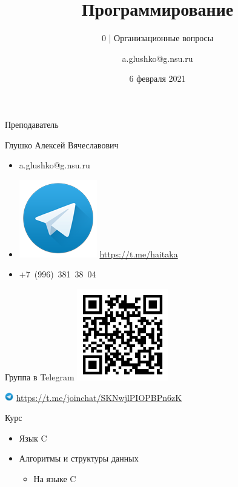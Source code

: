 \documentclass[aspectratio=169,14pt]{beamer}
\title{Программирование}
\subtitle{0 | Организационные вопросы}
\author{a.glushko@g.nsu.ru}
\date{6 февраля 2021}
\begin{document}
    \begin{frame}
        \titlepage
    \end{frame}

    \begin{frame}{Преподаватель}
        \begin{block}{Глушко Алексей Вячеславович}
            \begin{itemize}
                \item a.glushko@g.nsu.ru
                \item \includegraphics[height=\fontcharht\font`\B]{media/telegram128} \url{https://t.me/haitaka} %
                \item +7~(996)~381~38~04
            \end{itemize}
        \end{block}
    \end{frame}

    \begin{frame}{Группа в Telegram}
        \includegraphics[width=4cm]{media/telegram-invite-qr}

        \includegraphics[height=1em]{media/telegram128} \url{https://t.me/joinchat/SKNwjlPIOPBPn6zK} %
    \end{frame}

    \begin{frame}{Курс}
        \begin{itemize}
            \item Язык C
            \item Алгоритмы и структуры данных
                \begin{itemize}
                    \item На языке C
                \end{itemize}
        \end{itemize}
    \end{frame}
\end{document}

